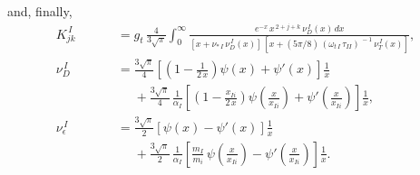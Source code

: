 \documentclass[12pt,prb,aps]{revtex4-1}
\begin{document}
and, finally, 
\begin{align}
 K_{jk}^{\,I} &= g_t\,\frac{4}{3\sqrt{\pi}}\int_0^\infty
\frac{e^{-x}\,x^{\,2+j+k}\,\nu_D^{\,I}(x)\,dx}{[x+\nu_{\ast\,I}\,\nu_D^{\,I}(x)]\,[x+(5\pi/8)\,(\omega_{t\,I}\,\tau_{II})^{\,-1}\,\nu_T^{\,I}(x)]},\\[0.5ex]
 \nu_D^{\,I}&= \frac{3\sqrt{\pi}}{4}\left[\left(1-\frac{1}{2\,x}\right)\psi(x)+\psi'(x)\right]\frac{1}{x}\nonumber\\[0.5ex]\phantom{===}
&\phantom{=}+\frac{3\sqrt{\pi}}{4}\,\frac{1}{\alpha_I}\left[\left(1-\frac{x_{Ii}}{2\,x}\right)\psi\!\left(\frac{x}{x_{Ii}}\right)
+\psi'\!\left(\frac{x}{x_{Ii}}\right)\right]\frac{1}{x},\\[0.5ex]
 \nu_\epsilon^{\,I}&= \frac{3\sqrt{\pi}}{2}\left[\psi(x)-\psi'(x)\right]\frac{1}{x}\nonumber\\[0.5ex]\phantom{===}
&\phantom{=}+\frac{3\sqrt{\pi}}{2}\,\frac{1}{\alpha_I}\left[\frac{m_I}{m_i}\,\psi\!\left(\frac{x}{x_{Ii}}\right)
-\psi'\!\left(\frac{x}{x_{Ii}}\right)\right]\frac{1}{x}.
\end{align}
\end{document}
